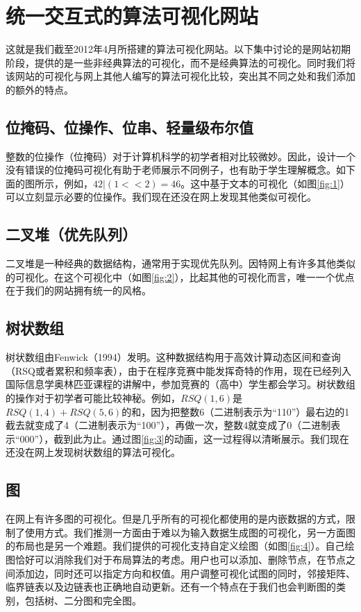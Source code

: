 \chapter{统一交互式的算法可视化网站}
\begin{sectext}
这就是我们截至2012年4月所搭建的算法可视化网站。以下集中讨论的是网站初期阶段，提供的是一些非经典算法的可视化，而不是经典算法的可视化。同时我们将该网站的可视化与网上其他人编写的算法可视化比较，突出其不同之处和我们添加的额外的特点。
\end{sectext}
\section{位掩码、位操作、位串、轻量级布尔值}
\begin{sectext}
整数的位操作（位掩码）对于计算机科学的初学者相对比较微妙。因此，设计一个没有错误的位掩码可视化有助于老师展示不同例子，也有助于学生理解概念。如下面的图所示，例如，$42 | (1 << 2) = 46$。这中基于文本的可视化（如图\ref{fig:1}）可以立刻显示必要的位操作。我们现在还没在网上发现其他类似可视化。

\end{sectext}
\section{二叉堆（优先队列）}
\begin{sectext}
二叉堆是一种经典的数据结构，通常用于实现优先队列。因特网上有许多其他类似的可视化。在这个可视化中（如图\ref{fig:2}），比起其他的可视化而言，唯一一个优点在于我们的网站拥有统一的风格。

\end{sectext}
\section{树状数组}
\begin{sectext}
树状数组由Fenwick（1994）发明。这种数据结构用于高效计算动态区间和查询（RSQ或者累积和频率表），由于在程序竞赛中能发挥奇特的作用，现在已经列入国际信息学奥林匹亚课程的讲解中，参加竞赛的（高中）学生都会学习。树状数组的操作对于初学者可能比较神秘。例如，$RSQ(1, 6)$是$RSQ(1, 4)+RSQ(5, 6)$的和，因为把整数6（二进制表示为``110''）最右边的1截去就变成了4（二进制表示为``100''），再做一次，整数4就变成了0（二进制表示``000''），截到此为止。通过图\ref{fig:3}的动画，这一过程得以清晰展示。我们现在还没在网上发现树状数组的算法可视化。


\end{sectext}
\section{图}
\begin{sectext}
在网上有许多图的可视化。但是几乎所有的可视化都使用的是内嵌数据的方式，限制了使用方式。我们推测一方面由于难以为输入数据生成图的可视化，另一方面图的布局也是另一个难题。我们提供的可视化支持自定义绘图（如图\ref{fig:4}）。自己绘图恰好可以消除我们对于布局算法的考虑。用户也可以添加、删除节点，在节点之间添加边，同时还可以指定方向和权值。用户调整可视化试图的同时，邻接矩阵、临界链表以及边链表也正确地自动更新。还有一个特点在于我们也会判断图的类别，包括树、二分图和完全图。
\end{sectext}

